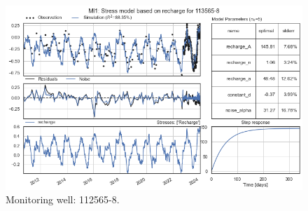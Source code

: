 \begin{figure}[htbp]
\begin{minipage}{0.32\textwidth}
        \centering
        \includegraphics[width=\linewidth]{frontmatter/Rozenburg-fig/9.png}
        \caption{Monitoring well: 112565-8.}
        \label{fig:112565-3}
    \end{minipage}
\end{figure}
